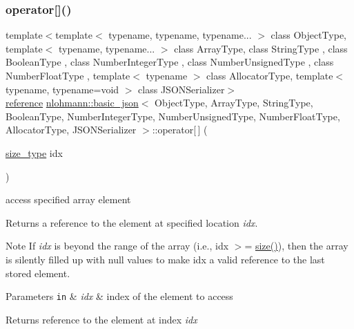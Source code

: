 \subsubsection{\texorpdfstring{operator[]()}{operator[]()}\hspace{0.1cm}{\footnotesize\ttfamily [1/8]}}
{\footnotesize\ttfamily template$<$template$<$ typename, typename, typename... $>$ class Object\+Type, template$<$ typename, typename... $>$ class Array\+Type, class String\+Type , class Boolean\+Type , class Number\+Integer\+Type , class Number\+Unsigned\+Type , class Number\+Float\+Type , template$<$ typename $>$ class Allocator\+Type, template$<$ typename, typename=void $>$ class J\+S\+O\+N\+Serializer$>$ \\
\hyperlink{classnlohmann_1_1basic__json_ac6a5eddd156c776ac75ff54cfe54a5bc}{reference} \hyperlink{classnlohmann_1_1basic__json}{nlohmann\+::basic\+\_\+json}$<$ Object\+Type, Array\+Type, String\+Type, Boolean\+Type, Number\+Integer\+Type, Number\+Unsigned\+Type, Number\+Float\+Type, Allocator\+Type, J\+S\+O\+N\+Serializer $>$\+::operator\mbox{[}$\,$\mbox{]} (\begin{DoxyParamCaption}\item[{\hyperlink{classnlohmann_1_1basic__json_a39f2cd0b58106097e0e67bf185cc519b}{size\+\_\+type}}]{idx }\end{DoxyParamCaption})\hspace{0.3cm}{\ttfamily [inline]}}



access specified array element 

Returns a reference to the element at specified location {\itshape idx}.

\begin{DoxyNote}{Note}
If {\itshape idx} is beyond the range of the array (i.\+e., {\ttfamily idx $>$= \hyperlink{classnlohmann_1_1basic__json_a25e27ad0c6d53c01871c5485e1f75b96}{size()}}), then the array is silently filled up with {\ttfamily null} values to make {\ttfamily idx} a valid reference to the last stored element.
\end{DoxyNote}

\begin{DoxyParams}[1]{Parameters}
\mbox{\tt in}  & {\em idx} & index of the element to access\\
\hline
\end{DoxyParams}
\begin{DoxyReturn}{Returns}
reference to the element at index {\itshape idx} 
\end{DoxyReturn}

